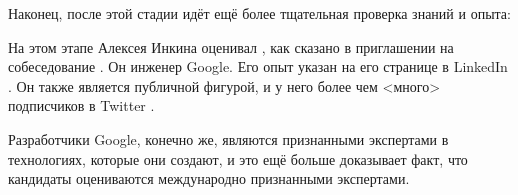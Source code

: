 Наконец, после этой стадии идёт ещё более тщательная проверка знаний и опыта:


На этом этапе Алексея Инкина оценивал \MrGdeGoogleInterviewer,
как сказано в приглашении на собеседование .
Он инженер Google.
Его опыт указан на его странице в LinkedIn .
Он также является публичной фигурой, и у него более чем <много> подписчиков в Twitter .

Разработчики Google, конечно же, являются признанными экспертами в технологиях, которые они создают,
и это ещё больше доказывает факт, что кандидаты оцениваются международно признанными экспертами.
